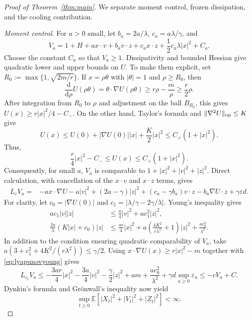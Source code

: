 \documentclass[11pt]{article}
\theoremstyle{definition}
\newcommand{\E}{\mathbb E}
\newcommand{\dd}{\mathrm d}
\newcommand{\eps}{\varepsilon}
\begin{document}
\begin{proof}[Proof of Theorem~\ref{thm:main}]
We separate moment control, frozen dissipation, and the cooling contribution.

\emph{Moment control.}
For $a>0$ small, let $b_a=2a/\lambda$, $c_a=a\lambda/\gamma$, and
\[
 V_a=1+H+a x\cdot v+b_a v\cdot z+c_a x\cdot z
                       +\frac12c_a\lambda|x|^2+C_a.
\]
Choose the constant $C_a$ so that $V_a\geq1$. Dissipativity and bounded Hessian
give quadratic lower and upper bounds on $U$.
To make them explicit, set
$R_0:=\max\{1,\sqrt{2m/r}\}$. If $x=\rho\theta$ with $|\theta|=1$ and
$\rho\geq R_0$, then
\[
 \frac{\dd}{\dd\rho}U(\rho\theta)
 =\theta\cdot\nabla U(\rho\theta)
 \geq r\rho-\frac m\rho\geq\frac r2\rho.
\]
After integration from $R_0$ to $\rho$ and adjustment on the ball $B_{R_0}$,
this gives $U(x)\geq r|x|^2/4-C_-$. On the other hand, Taylor's formula and
$\|\nabla^2U\|_{\rm op}\leq K$ give
\[
 U(x)\leq U(0)+|\nabla U(0)||x|+\frac K2|x|^2
 \leq C_+(1+|x|^2).
\]
Thus,
\begin{equation}\label{eq:quadraticU}
 \frac r4|x|^2-C_-\leq U(x)\leq C_+(1+|x|^2).
\end{equation}
Consequently, for small $a$,
$V_a$ is comparable to $1+|x|^2+|v|^2+|z|^2$.
Direct calculation, with cancellation of the $x\cdot v$ and $x\cdot z$ terms,
gives
\begin{align*}
 L_\eps V_a={}&-a x\cdot\nabla U-a|v|^2+(2a-\gamma)|z|^2
 +(c_a-\gamma b_a)v\cdot z-b_a\nabla U\cdot z+\gamma\eps d.
\end{align*}
For clarity, let $c_0=|\nabla U(0)|$ and
$c_1=|\lambda/\gamma-2\gamma/\lambda|$. Young's inequality gives
\begin{align}\label{eq:lyapunovyoung}
 a c_1|v||z|&\leq\frac a4|v|^2+a c_1^2|z|^2,\\
 \frac{2a}{\lambda}(K|x|+c_0)|z|
 &\leq\frac{ar}{4}|x|^2
       +a\left(\frac{4K^2}{r\lambda^2}+1\right)|z|^2
       +\frac{a c_0^2}{\lambda^2}.
\end{align}
In addition to the condition ensuring quadratic comparability of $V_a$, take
$a(3+c_1^2+4K^2/(r\lambda^2))\leq\gamma/2$.
Using $x\cdot\nabla U(x)\geq r|x|^2-m$ together with
\eqref{eq:lyapunovyoung} gives
\[
 L_{\eps_t}V_a
 \leq-\frac{3ar}{4}|x|^2-\frac{3a}{4}|v|^2-\frac{\gamma}{2}|z|^2
       +am+\frac{ac_0^2}{\lambda^2}+\gamma d\sup_{u\geq0}\eps_u
 \leq-cV_a+C.
\]
Dynkin's formula and Gr\"{o}nwall's inequality now yield
\begin{equation}\label{eq:moments}
 \sup_{t\geq0}\E\left[|X_t|^2+|V_t|^2+|Z_t|^2\right]<\infty.

\end{equation}
\end{proof}
\end{document}
